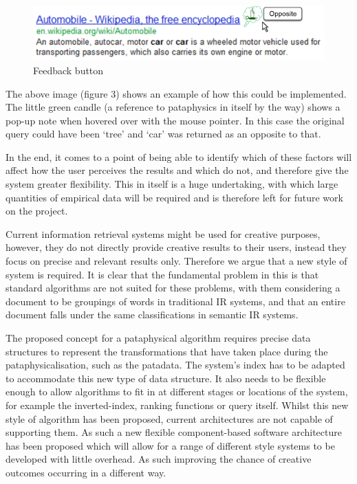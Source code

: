 \begin{figure}[!htb] %
\centering
\includegraphics[width=\textwidth]{images/carexample.png}
\caption[Feedback button]{Feedback button}
\label{fig:feedback}
\end{figure}

The above image (figure 3) shows an example of how this could be implemented. The little green candle (a reference to pataphysics in itself by the way) shows a pop-up note when hovered over with the mouse pointer. In this case the original query could have been ‘tree’ and ‘car’ was returned as an opposite to that.

In the end, it comes to a point of being able to identify which of these factors will affect how the user perceives the results and which do not, and therefore give the system greater flexibility. This in itself is a huge undertaking, with which large quantities of empirical data will be required and is therefore left for future work on the project.

Current information retrieval systems might be used for creative purposes, however, they do not directly provide creative results to their users, instead they focus on precise and relevant results only. Therefore we argue that a new style of system is required. It is clear that the fundamental problem in this is that standard algorithms are not suited for these problems, with them considering a document to be groupings of words in traditional IR systems, and that an entire document falls under the same classifications in semantic IR systems.

The proposed concept for a pataphysical algorithm requires precise data structures to represent the transformations that have taken place during the pataphysicalisation, such as the patadata. The system’s index has to be adapted to accommodate this new type of data structure. It also needs to be flexible enough to allow algorithms to fit in at different stages or locations of the system, for example the inverted-index, ranking functions or query itself.
Whilst this new style of algorithm has been proposed, current architectures are not capable of supporting them. As such a new flexible component-based software architecture has been proposed which will allow for a range of different style systems to be developed with little overhead. As such improving the chance of creative outcomes occurring in a different way.

